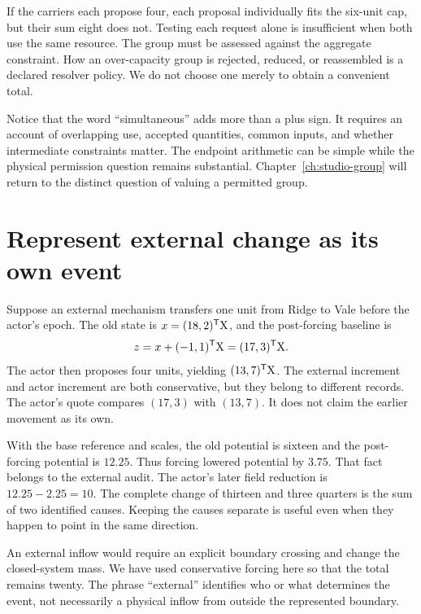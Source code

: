 If the carriers each propose four, each proposal individually fits the six-unit cap, but their sum eight does not. Testing each request alone is insufficient when both use the same resource. The group must be assessed against the aggregate constraint. How an over-capacity group is rejected, reduced, or reassembled is a declared resolver policy. We do not choose one merely to obtain a convenient total.

Notice that the word ``simultaneous'' adds more than a plus sign. It requires an account of overlapping use, accepted quantities, common inputs, and whether intermediate constraints matter. The endpoint arithmetic can be simple while the physical permission question remains substantial. Chapter~\ref{ch:studio-group} will return to the distinct question of valuing a permitted group.

\section{Represent external change as its own event}

Suppose an external mechanism transfers one unit from Ridge to Vale before the actor's epoch. The old state is \(x=(18,2)^{\mathsf T}\mathrm{X}\), and the post-forcing baseline is
\begin{equation}
z=x+(-1,1)^{\mathsf T}\mathrm{X}=(17,3)^{\mathsf T}\mathrm{X}.
\end{equation}
The actor then proposes four units, yielding \((13,7)^{\mathsf T}\mathrm{X}\). The external increment and actor increment are both conservative, but they belong to different records. The actor's quote compares \((17,3)\) with \((13,7)\). It does not claim the earlier movement as its own.

With the base reference and scales, the old potential is sixteen and the post-forcing potential is \(12.25\). Thus forcing lowered potential by \(3.75\). That fact belongs to the external audit. The actor's later field reduction is \(12.25-2.25=10\). The complete change of thirteen and three quarters is the sum of two identified causes. Keeping the causes separate is useful even when they happen to point in the same direction.

An external inflow would require an explicit boundary crossing and change the closed-system mass. We have used conservative forcing here so that the total remains twenty. The phrase ``external'' identifies who or what determines the event, not necessarily a physical inflow from outside the represented boundary.

